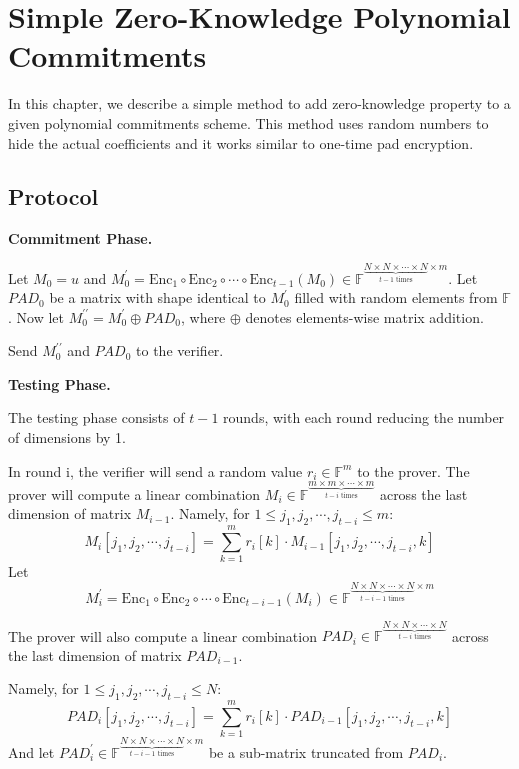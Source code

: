 \chapter{Simple Zero-Knowledge Polynomial Commitments}

In this chapter, we describe a simple method to add zero-knowledge property to a given polynomial commitments scheme. This method uses random numbers to hide the actual coefficients and it works similar to one-time pad encryption.

\section{Protocol}

\textbf{Commitment Phase.}

Let $M_0 = u$ and $ M_0^{\prime} = \text{Enc}_1 \circ \text{Enc}_2 \circ \cdots \circ \text{Enc}_{t-1} (M_0) \in \mathbb{F}^{\underbrace{N \times N \times \cdots \times N}_{t-1 \text{ times}} \times m}$.
Let $PAD_0$ be a matrix with shape identical to $M_0^\prime$ filled with random elements from $\mathbb{F}$. Now let $M_0^{\prime\prime} = M_0^{\prime} \oplus PAD_0$, where $\oplus$ denotes elements-wise matrix addition.

Send $M_0^{\prime\prime}$ and $PAD_0$ to the verifier.

\textbf{Testing Phase.}

The testing phase consists of $t-1$ rounds, with each round reducing the number of dimensions by 1.

In round i, the verifier will send a random value $r_i \in \mathbb{F}^m$ to the prover.
The prover will compute a linear combination $M_i \in \mathbb{F}^{\underbrace{m \times m \times \cdots \times m}_{t-i \text{ times}}}$ across the last dimension of matrix $M_{i-1}$.
Namely, for $1 \le j_1,j_2, \cdots, j_{t-i} \le m$:
$$M_i[j_1,j_2, \cdots, j_{t-i}] = \sum_{k=1}^{m} r_{i}[k] \cdot M_{i-1}[j_1,j_2, \cdots, j_{t-i}, k]$$
Let 
$$
M_i^\prime = \text{Enc}_1 \circ \text{Enc}_2 \circ \cdots \circ \text{Enc}_{t - i - 1}(M_i)\in \mathbb{F}^{\underbrace{N \times N \times \cdots \times N}_{t-i-1 \text{ times}} \times m}
$$

The prover will also compute a linear combination $PAD_i \in \mathbb{F}^{\underbrace{N \times N \times \cdots \times N}_{t-i \text{ times}}}$ across the last dimension of matrix $PAD_{i-1}$.

Namely, for $1 \le j_1,j_2, \cdots, j_{t-i} \le N$:
$$PAD_i[j_1,j_2, \cdots, j_{t-i}] = \sum_{k=1}^{m} r_{i}[k] \cdot PAD_{i-1}[j_1,j_2, \cdots, j_{t-i}, k]$$
And let $PAD_i^\prime \in \mathbb{F}^{\underbrace{N \times N \times \cdots \times N}_{t-i-1 \text{ times}} \times m}$ be a sub-matrix truncated from $PAD_i$.

